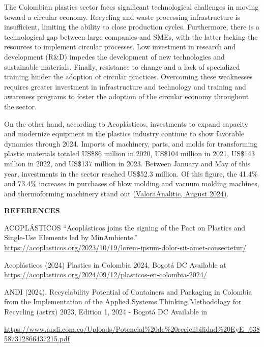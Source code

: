 \documentclass[
  12pt,
  oneside]{book}
\begin{document}
The Colombian plastics sector faces significant technological challenges
in moving toward a circular economy. Recycling and waste processing
infrastructure is insufficient, limiting the ability to close production
cycles. Furthermore, there is a technological gap between large
companies and SMEs, with the latter lacking the resources to implement
circular processes. Low investment in research and development (R\&D)
impedes the development of new technologies and sustainable materials.
Finally, resistance to change and a lack of specialized training hinder
the adoption of circular practices. Overcoming these weaknesses requires
greater investment in infrastructure and technology and training and
awareness programs to foster the adoption of the circular economy
throughout the sector.

On the other hand, according to Acoplásticos, investments to expand
capacity and modernize equipment in the plastics industry continue to
show favorable dynamics through 2024. Imports of machinery, parts, and
molds for transforming plastic materials totaled US\$86 million in 2020,
US\$104 million in 2021, US\$143 million in 2022, and US\$137 million in
2023. Between January and May of this year, investments in the sector
reached US\$52.3 million. Of this figure, the 41.4\% and 73.4\%
increases in purchases of blow molding and vacuum molding machines, and
thermoforming machinery stand out
\href{https://es-us.finanzas.yahoo.com/noticias/exportaciones-productos-pl\%C3\%A1sticos-colombia-crecieron-232000303.html}{(ValoraAnalitic,
August 2024)}.

\textbf{REFERENCES}

ACOPLÁSTICOS ``Acoplásticos joins the signing of the Pact on Plastics
and Single-Use Elements led by MinAmbiente.''
\url{https://acoplasticos.org/2023/10/19/lorem-ipsum-dolor-sit-amet-consectetur/}

Acoplásticos (2024) Plastics in Colombia 2024, Bogotá DC Available at
\url{https://acoplasticos.org/2024/09/12/plasticos-en-colombia-2024/}

ANDI (2024). Recyclability Potential of Containers and Packaging in
Colombia from the Implementation of the Applied Systems Thinking
Methodology for Recycling (astrx) 2023, Edition 1, 2024 - Bogotá DC
Available in

\href{https://www.andi.com.co/Uploads/Potencial\%20de\%20reciclabilidad\%20EyE_638587312866437215.pdf}{https://www.andi.com.co/Uploads/Potencial\%20de\%20reciclibilidad\%20EyE\_638587312866437215.pdf}
\end{document}
